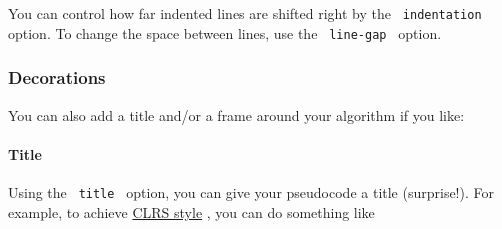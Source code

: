 You can control how far indented lines are shifted right by the
\texttt{\ indentation\ } option. To change the space between lines, use
the \texttt{\ line-gap\ } option.

\begin{Shaded}
\begin{Highlighting}[]
\NormalTok{\#pseudocode{-}list(indentation: 3em, line{-}gap: 1.5em)[}
\NormalTok{]}
\end{Highlighting}
\end{Shaded}

\pandocbounded{}

\subsubsection{Decorations}\label{decorations}

You can also add a title and/or a frame around your algorithm if you
like:

\paragraph{Title}\label{title}

Using the \texttt{\ title\ } option, you can give your pseudocode a
title (surprise!). For example, to achieve
\href{https://en.wikipedia.org/wiki/Introduction_to_Algorithms}{CLRS
style} , you can do something like

\begin{Shaded}
\begin{Highlighting}[]
\NormalTok{\#pseudocode{-}list(stroke: none, title: smallcaps[Fancy{-}Algorithm])[}
\NormalTok{]}
\end{Highlighting}
\end{Shaded}

